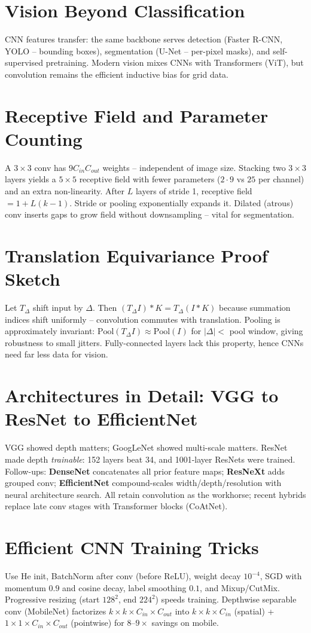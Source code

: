 \section{Vision Beyond Classification}
CNN features transfer: the same backbone serves detection (Faster R-CNN, YOLO -- bounding boxes), segmentation (U-Net -- per-pixel masks), and self-supervised pretraining. Modern vision mixes CNNs with Transformers (ViT), but convolution remains the efficient inductive bias for grid data.

\section{Receptive Field and Parameter Counting}
A $3\times3$ conv has $9C_{in}C_{out}$ weights -- independent of image size.
Stacking two $3\times3$ layers yields a $5\times5$ receptive field with fewer
parameters ($2\cdot9$ vs $25$ per channel) and an extra non-linearity. After
$L$ layers of stride 1, receptive field $=1+L(k-1)$. Stride or pooling
exponentially expands it. Dilated (atrous) conv inserts gaps to grow field
without downsampling -- vital for segmentation.

\section{Translation Equivariance Proof Sketch}
Let $T_{\Delta}$ shift input by $\Delta$. Then $(T_{\Delta}I)*K = T_{\Delta}(I*K)$
because summation indices shift uniformly -- convolution commutes with
translation. Pooling is approximately invariant: $\text{Pool}(T_{\Delta}I)\approx
\text{Pool}(I)$ for $|\Delta|<$ pool window, giving robustness to small jitters.
Fully-connected layers lack this property, hence CNNs need far less data for
vision.

\section{Architectures in Detail: VGG to ResNet to EfficientNet}
VGG showed depth matters; GoogLeNet showed multi-scale matters. ResNet made
depth \emph{trainable}: 152 layers beat 34, and 1001-layer ResNets were trained.
Follow-ups: \textbf{DenseNet} concatenates all prior feature maps; \textbf{ResNeXt}
adds grouped conv; \textbf{EfficientNet} compound-scales width/depth/resolution
with neural architecture search. All retain convolution as the workhorse; recent
hybrids replace late conv stages with Transformer blocks (CoAtNet).

\section{Efficient CNN Training Tricks}
Use He init, BatchNorm after conv (before ReLU), weight decay $10^{-4}$, SGD
with momentum $0.9$ and cosine decay, label smoothing $0.1$, and Mixup/CutMix.
Progressive resizing (start $128^2$, end $224^2$) speeds training. Depthwise
separable conv (MobileNet) factorizes $k\times k\times C_{in}\times C_{out}$
into $k\times k\times C_{in}$ (spatial) + $1\times1\times C_{in}\times C_{out}$
(pointwise) for $8$--$9\times$ savings on mobile.


